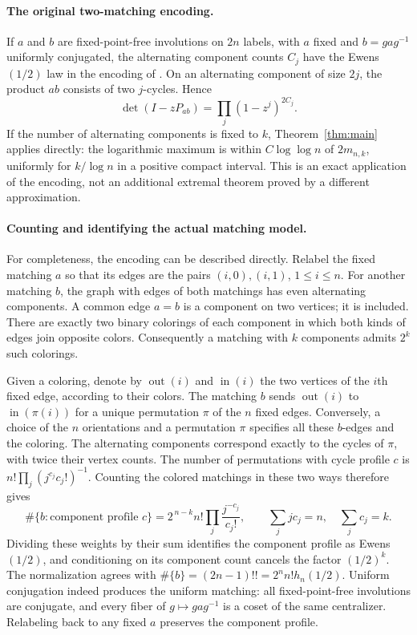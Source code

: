\documentclass[11pt]{article}
\theoremstyle{definition}\newtheorem{definition}[theorem]{Definition}
\theoremstyle{remark}\newtheorem{remark}[theorem]{Remark}
\numberwithin{equation}{section}\allowdisplaybreaks
\begin{document}
\paragraph{The original two-matching encoding.}
If $a$ and $b$ are fixed-point-free involutions on $2n$ labels, with $a$
fixed and $b=gag^{-1}$ uniformly conjugated, the alternating component
counts $C_j$ have the Ewens$(1/2)$ law in the encoding of \cite{Lu}.
On an alternating component of size $2j$, the product $ab$ consists of
two $j$-cycles. Hence
\[
 \det(I-zP_{ab})=\prod_j(1-z^j)^{2C_j}.
\]
If the number of alternating components is fixed to $k$,
Theorem~\ref{thm:main} applies directly: the logarithmic maximum is within
$C\log\log n$ of $2m_{n,k}$, uniformly for $k/\log n$ in a positive
compact interval. This is an exact application of the encoding, not an
additional extremal theorem proved by a different approximation.

\paragraph{Counting and identifying the actual matching model.}
For completeness, the encoding can be described directly.
Relabel the fixed matching $a$ so that its edges are
the pairs $(i,0),(i,1)$, $1\le i\le n$. For another
matching $b$, the graph with edges of both matchings
has even alternating components. A common edge
$a=b$ is a component on two vertices; it is included.
There are exactly two binary colorings of each
component in which both kinds of edges join opposite
colors. Consequently a matching with $k$ components
admits $2^k$ such colorings.

Given a coloring, denote by $\operatorname{out}(i)$
and $\operatorname{in}(i)$ the two vertices of the
$i$th fixed edge, according to their colors.
The matching $b$ sends $\operatorname{out}(i)$ to
$\operatorname{in}(\pi(i))$ for a unique permutation
$\pi$ of the $n$ fixed edges. Conversely, a choice
of the $n$ orientations and a permutation $\pi$
specifies all these $b$-edges and the coloring.
The alternating components correspond exactly to
the cycles of $\pi$, with twice their vertex counts.
The number of permutations with cycle profile $c$
is $n!\prod_j(j^{c_j}c_j!)^{-1}$. Counting the
colored matchings in these two ways therefore gives
\[
 \#\{b:\text{component profile }c\}
 =2^{\,n-k}n!\prod_j\frac{j^{-c_j}}{c_j!},
 \qquad \sum_jjc_j=n,\quad \sum_jc_j=k.
\]
Dividing these weights by their sum identifies the
component profile as Ewens$(1/2)$, and conditioning
on its component count cancels the factor $(1/2)^k$.
The normalization agrees with
$\#\{b\}=(2n-1)!!=2^n n!h_n(1/2)$.
Uniform conjugation indeed produces the uniform
matching: all fixed-point-free involutions are
conjugate, and every fiber of $g\mapsto gag^{-1}$
is a coset of the same centralizer. Relabeling back
to any fixed $a$ preserves the component profile.
\end{document}
